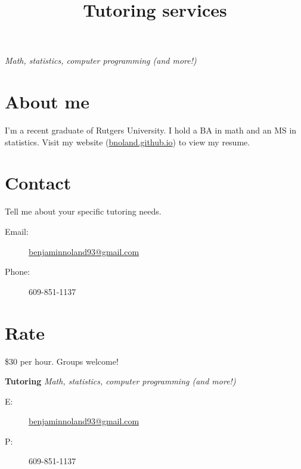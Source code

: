 \documentclass{article}
\title{\fontsize{50}{0}\selectfont \vspace{-2ex}\textbf{Tutoring services}\vspace{-1.5ex}}
\author{}
\date{}
\begin{document}
\maketitle

\Huge

\begin{center}
{\Huge \emph{Math, statistics, computer programming (and more!)}}
\end{center}

\section*{About me}

I'm a recent graduate of Rutgers University. I hold a BA in math and
an MS in statistics. Visit my website (\url{bnoland.github.io}) to
view my resume.

\section*{Contact}

Tell me about your specific tutoring needs.
\medskip
\begin{description}
\item[Email:] \url{benjaminnoland93@gmail.com}
\item[Phone:] 609-851-1137
\end{description}

\section*{Rate}

\$30 per hour. Groups welcome!

\stubs[10]{5.2cm}
{
\small
\textbf{Tutoring} \emph{Math, statistics, computer programming (and more!)}
\begin{description}
\item[E:] \url{benjaminnoland93@gmail.com}
\item[P:] 609-851-1137
\end{description}
}
\end{document}
